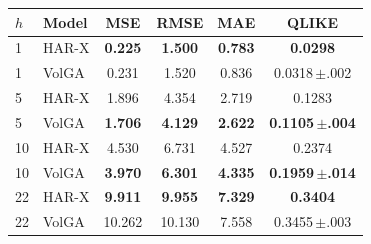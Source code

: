 \begin{tabular}{llcccc}
\toprule
$h$ & Model & MSE & RMSE & MAE & QLIKE \\
\midrule
1 & HAR-X & \textbf{0.225} & \textbf{1.500} & \textbf{0.783} & \textbf{0.0298} \\
1 & VolGA & 0.231 & 1.520 & 0.836 & 0.0318\,$\pm$.002 \\
\midrule
5 & HAR-X & 1.896 & 4.354 & 2.719 & 0.1283 \\
5 & VolGA & \textbf{1.706} & \textbf{4.129} & \textbf{2.622} & \textbf{0.1105\,$\pm$.004} \\
\midrule
10 & HAR-X & 4.530 & 6.731 & 4.527 & 0.2374 \\
10 & VolGA & \textbf{3.970} & \textbf{6.301} & \textbf{4.335} & \textbf{0.1959\,$\pm$.014} \\
\midrule
22 & HAR-X & \textbf{9.911} & \textbf{9.955} & \textbf{7.329} & \textbf{0.3404} \\
22 & VolGA & 10.262 & 10.130 & 7.558 & 0.3455\,$\pm$.003 \\
\bottomrule
\end{tabular}
